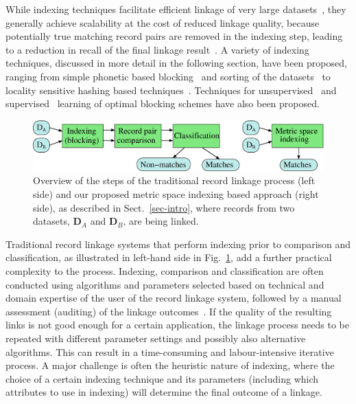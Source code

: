 \documentclass{llncs}
\begin{document}
While indexing techniques facilitate efficient linkage of very large
datasets~\cite{Don15}, they generally achieve scalability at the cost
of reduced linkage quality, because potentially true matching record
pairs are removed in the indexing step, leading to a reduction in
recall of the final linkage result~\cite{Chr12}. A variety of indexing
techniques, discussed in more detail in the following section, have
been proposed, ranging from simple phonetic based blocking~\cite{Chr12}
and sorting of the datasets~\cite{Dra12} to locality sensitive hashing
based techniques~\cite{Kim10,Steorts2014}. Techniques for
unsupervised~\cite{Kej13,Ram15} and supervised~\cite{Bil06,Mic06}
learning of optimal blocking schemes have also been proposed.


\begin{figure}[!t]
  \centering
  \includegraphics[width=1.0\textwidth]{figures/linkage-process}
  \caption{Overview of the steps of the traditional record linkage
           process (left side) and our proposed metric space
           indexing based approach (right side), as described in
           Sect.~\ref{sec-intro}, where records from two datasets,
           $\mathbf{D}_A$ and $\mathbf{D}_B$, are being linked.}
           \label{fig-rl-process}
\end{figure}


Traditional record linkage systems that perform indexing prior to
comparison and classification, as illustrated in left-hand side in
Fig.~\ref{fig-rl-process}, add a further practical complexity to the
process. Indexing, comparison and classification are often conducted
using algorithms and parameters selected based on technical and
domain expertise of the user of the record linkage system, followed
by a manual assessment (auditing) of the linkage
outcomes~\cite{Chr12}. If the quality of the resulting links is not
good enough for a certain application, the linkage process needs to
be repeated with different parameter settings and possibly also
alternative algorithms. This can result in a time-consuming and
labour-intensive iterative process. A major challenge is often the
heuristic nature of indexing, where the choice of a certain indexing
technique and its parameters (including which attributes to use in indexing) will determine the final outcome of a linkage.
\end{document}

